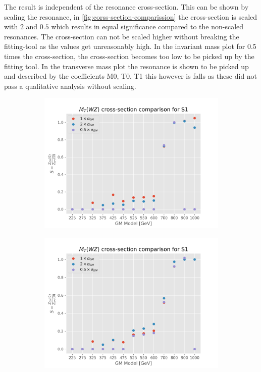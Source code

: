 \documentclass[../Bachelorarbeit.tex]{subfiles}
\begin{document}
\newpage
The result is independent of the resonance cross-section. This can be shown by scaling the resonance, in \ref{fig:corss-section-comparission} the cross-section is scaled with $2$ and $0.5$ which results in equal significance compared to the non-scaled resonances.
The cross-section can not be scaled higher without breaking the fitting-tool as the values get unreasonably high. In the invariant mass plot for 0.5 times the cross-section, the cross-section becomes too low to be picked up by the fitting tool. In the transverse mass plot
the resonance is shown to be picked up and described by the coefficients M0, T0, T1 this however is falls as these did not pass a qualitative analysis without scaling.
\begin{figure}[h]
    \centering
    \begin{subfigure}{0.45\textwidth}
        \includegraphics[width=\textwidth]{Plots/gm_relevanze/MWZ_comparision_S1.png}
        \caption{}
    \end{subfigure}
    \begin{subfigure}{0.45\textwidth}
        \includegraphics[width=\textwidth]{Plots/gm_relevanze/MTWZ_comparision_S1.png}

\end{subfigure}
\end{figure}
\end{document}
